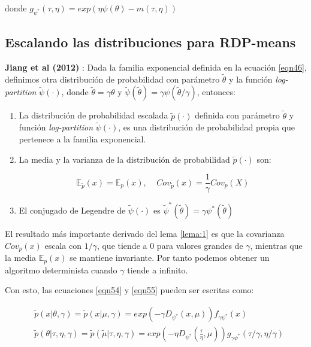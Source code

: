 donde $g_{\psi^*}(\tau, \eta) = exp(\eta \psi(\theta) - m(\tau, \eta))$

\subsection{Escalando las distribuciones para RDP-means}

\begin{lema}

	\textbf{Jiang et al (2012)} \cite{DPM:2012}: Dada la familia exponencial definida en la ecuación \ref{eqn46}, definimos otra distribución de probabilidad con parámetro $\widetilde{\theta}$ y la función \textit{log-partition} $\widetilde{\psi}(\cdot)$, donde $\widetilde{\theta} = \gamma\theta$ y $\widetilde{\psi}(\widetilde{\theta}) = \gamma \psi (\widetilde{\theta}/\gamma)$, entonces:
	
	\begin{enumerate}
		
		\item La distribución de probabilidad escalada $\widetilde{p}(\cdot)$ definida con parámetro $\widetilde{\theta}$ y función \textit{log-partition} $\widetilde{\psi}(\cdot)$, es una distribución de probabilidad propia que pertenece a la familia exponencial.
		
		\item La media y la varianza de la distribución de probabilidad $\widetilde{p}(\cdot)$ son:
		
		$$ \mathbb{E}_{\widetilde{p}}(x) = \mathbb{E}_{p}(x), \;\;\;\; Cov_{\widetilde{p}}(x) = \frac{1}{\gamma}Cov_p(X) $$
		
		\item El conjugado de Legendre de $\widetilde{\psi}(\cdot)$ es $\widetilde{\psi}^*(\widetilde{\theta}) = \gamma \psi^*(\widetilde{\theta}) $
		
	\end{enumerate}
	\label{lema:1}
\end{lema}

El resultado más importante derivado del lema \ref{lema:1} es que la covarianza $Cov_p(x)$ escala con $1/\gamma$, que tiende a $0$ para valores grandes de $\gamma$, mientras que la media $\mathbb{E}_{p}(x)$ se mantiene invariante. Por tanto podemos obtener un algoritmo determinista cuando $\gamma$ tiende a infinito.

Con esto, las ecuaciones \ref{eqn54} y \ref{eqn55} pueden ser escritas como:

\begin{equation}
\begin{split}
&\widetilde{p}(x|\theta, \gamma) = \widetilde{p}(x|\mu, \gamma) = exp(-\gamma D_{\psi^*}(x,\mu)) f_{\gamma \psi^*}(x)\\
&\widetilde{p}(\theta|\tau,\eta,\gamma) = \widetilde{p}(\widetilde{\mu}|\tau,\eta,\gamma) = exp\left(-\eta D_{\psi^*}(\frac{\tau}{\eta}, \mu)\right)g_{\gamma \psi^*}(\tau / \gamma, \eta / \gamma)
\end{split}
\label{eqn56}
\end{equation}

